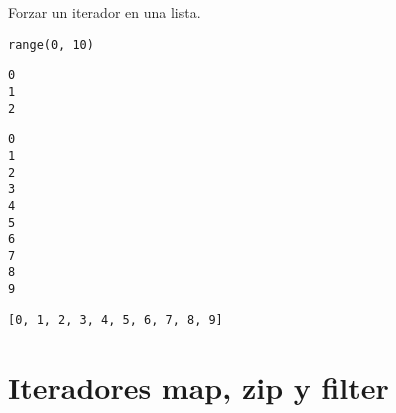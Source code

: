 \begin{code} Forzar un iterador en una lista.
\begin{Shaded}
\begin{Highlighting}[]
\OperatorTok{=} \NormalTok{(}\NormalTok{)}
\end{Highlighting}
\end{Shaded}

\begin{verbatim}
range(0, 10)
\end{verbatim}

\begin{Shaded}
\begin{Highlighting}[]
\OperatorTok{=} 
\NormalTok{(}
\NormalTok{(}
\NormalTok{())}
\end{Highlighting}
\end{Shaded}

\begin{verbatim}
0
1
2
\end{verbatim}

\begin{Shaded}
\begin{Highlighting}[]
\OperatorTok{=} 
    \NormalTok{(}
\end{Highlighting}
\end{Shaded}

\begin{verbatim}
0
1
2
3
4
5
6
7
8
9
\end{verbatim}

\begin{Shaded}
\begin{Highlighting}[]
\end{Highlighting}
\end{Shaded}

\begin{verbatim}
[0, 1, 2, 3, 4, 5, 6, 7, 8, 9]
\end{verbatim}
\end{code}


\section{Iteradores map, zip y filter}

